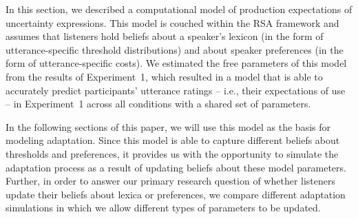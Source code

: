 In this section, we described a computational model of production expectations of uncertainty expressions. This model
is couched within the RSA framework and assumes that listeners hold beliefs about a speaker's lexicon (in the form
of utterance-specific threshold distributions) and about speaker preferences (in the form of utterance-specific costs). We estimated 
the free parameters of this model from the results of Experiment~1, which resulted in a model that is able to accurately predict
participants' utterance ratings -- i.e., their expectations of use --  in Experiment~1 across all conditions with a shared set of parameters.

In the following sections of this paper, we will use this model as the basis for modeling adaptation. Since this model
is able to capture different beliefs about thresholds and preferences, it provides us with the opportunity to simulate 
the adaptation process as a result of updating beliefs about these model parameters. Further, in order to answer
our primary research question of whether listeners update their beliefs about lexica or preferences, we compare
different adaptation simulations in which we allow different types of parameters to be updated.

